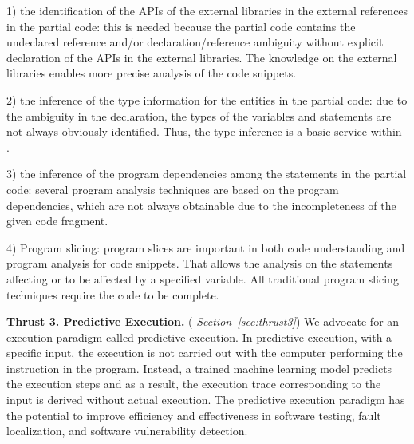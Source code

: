 1) the identification of the APIs of the external libraries in the
external references in the partial code: this is needed because the
partial code contains the undeclared reference and/or
declaration/reference ambiguity without explicit declaration of the
APIs in the external libraries. The knowledge on the external
libraries enables more precise analysis of the code snippets.

2) the inference of the type information for the entities in the
partial code: due to the ambiguity in the declaration, the types of
the variables and statements are not always obviously
identified. Thus, the type inference is a basic service within
{\tool}.

3) the inference of the program dependencies among the statements in
the partial code: several program analysis techniques are based on the
program dependencies, which are not always obtainable due to the
incompleteness of the given code fragment.

4) Program slicing: program slices are important in both code
understanding and program analysis for code snippets. That allows the
analysis on the statements affecting or to be affected by a specified
variable. All traditional program slicing techniques require the code
to be complete.

\vspace{3pt}
\noindent \textbf{Thrust 3. Predictive Execution.}  ({\em
  Section~\ref{sec:thrust3}}) We advocate for an execution paradigm
called predictive execution. In predictive execution, with a specific
input, the execution is not carried out with the computer performing
the instruction in the program. Instead, a trained machine learning
model predicts the execution steps and as a result, the execution
trace corresponding to the input is derived without actual execution.
The predictive execution paradigm has the potential to improve
efficiency and effectiveness in software testing, fault localization,
and software vulnerability detection.


